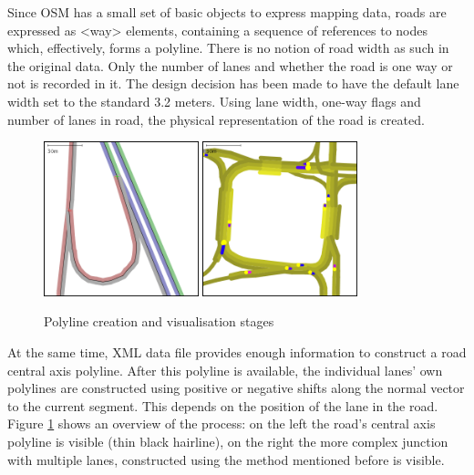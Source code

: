  Since OSM has a small set of basic objects to express mapping data, roads are expressed as <way> elements, containing a sequence of references to nodes which, effectively, forms a polyline. There is no notion of road width as such in the original data. Only the number of lanes and whether the road is one way or not is recorded in it. The design decision has been made to have the default lane width set to the standard 3.2 meters\cite{Council2016}. Using lane width, one-way flags and number of lanes in road, the physical representation of the road is created.

\begin{figure}[h]
    \vspace{1.5em}
    \caption{Polyline creation and visualisation stages}
    \label{fig:roadAndLanesPolylines}
    \centering
    \includegraphics[width=0.4\textwidth]{figs/road/road_polyline.png}
    \hspace{0.2em}
    \includegraphics[width=0.4\textwidth]{figs/road/road_lanes.png}
    \vspace{1.5em}
\end{figure}

At the same time, XML data file provides enough information to construct a road central axis polyline. After this polyline is available, the individual lanes' own polylines are constructed using positive or negative shifts along the normal vector to the current segment. This depends on the position of the lane in the road. Figure \ref{fig:roadAndLanesPolylines} shows an overview of the process: on the left the road's central axis polyline is visible (thin black hairline), on the right the more complex junction with multiple lanes, constructed using the method mentioned before is visible.

